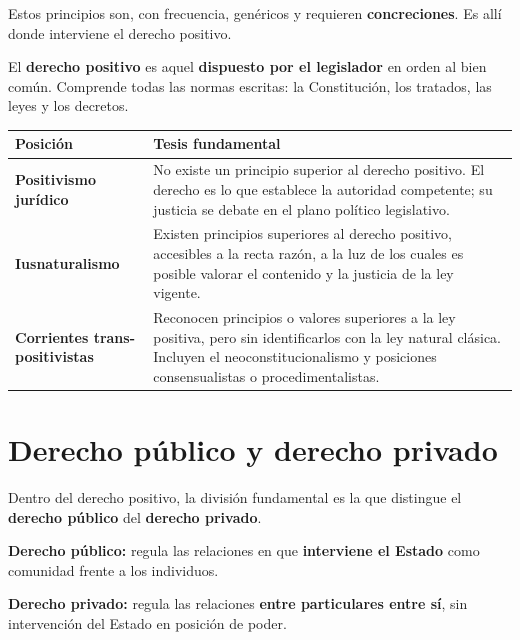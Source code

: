 \documentclass[12pt, a4paper]{report}
\begin{document}
Estos principios son, con frecuencia, genéricos y requieren
\textbf{concreciones}. Es allí donde interviene el derecho positivo.

\begin{definition}
El \textbf{derecho positivo} es aquel \textbf{dispuesto por el legislador} en
orden al bien común. Comprende todas las normas escritas: la Constitución, los
tratados, las leyes y los decretos.
\end{definition}

\vspace{4pt}
\begin{center}
\begin{tabular}{L{4.2cm} L{9cm}}
\toprule
\textbf{Posición} & \textbf{Tesis fundamental} \\
\midrule
\textbf{Positivismo jurídico} &
  No existe un principio superior al derecho positivo. El derecho es lo que
  establece la autoridad competente; su justicia se debate en el plano político
  legislativo. \\
\addlinespace
\textbf{Iusnaturalismo} &
  Existen principios superiores al derecho positivo, accesibles a la recta
  razón, a la luz de los cuales es posible valorar el contenido y la justicia
  de la ley vigente. \\
\addlinespace
\textbf{Corrientes trans-positivistas} &
  Reconocen principios o valores superiores a la ley positiva, pero sin
  identificarlos con la ley natural clásica. Incluyen el neoconstitucionalismo
  y posiciones consensualistas o procedimentalistas. \\
\bottomrule
\end{tabular}
\end{center}
\vspace{4pt}

\section{Derecho público y derecho privado}

Dentro del derecho positivo, la división fundamental es la que distingue el
\textbf{derecho público} del \textbf{derecho privado}.

\begin{definition}
\textbf{Derecho público:} regula las relaciones en que \textbf{interviene el
Estado} como comunidad frente a los individuos.

\textbf{Derecho privado:} regula las relaciones \textbf{entre particulares
entre sí}, sin intervención del Estado en posición de poder.
\end{definition}
\end{document}
